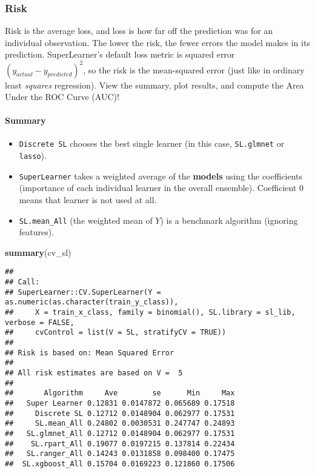 \documentclass[
]{book}
\newenvironment{Shaded}{\begin{snugshade}}{\end{snugshade}}
\newcommand{\KeywordTok}[1]{\textcolor[rgb]{0.13,0.29,0.53}{\textbf{#1}}}
\newcommand{\NormalTok}[1]{#1}
\providecommand{\tightlist}{%
  \setlength{\itemsep}{0pt}\setlength{\parskip}{0pt}}
\begin{document}
\hypertarget{risk}{%
\subsubsection{Risk}\label{risk}}

Risk is the average loss, and loss is how far off the prediction was for an individual observation. The lower the risk, the fewer errors the model makes in its prediction. SuperLearner's default loss metric is squared error \((y_{actual} - y_{predicted})^2\), so the risk is the mean-squared error (just like in ordinary least \emph{squares} regression). View the summary, plot results, and compute the Area Under the ROC Curve (AUC)!

\hypertarget{summary}{%
\paragraph{Summary}\label{summary}}

\begin{itemize}
\tightlist
\item
  \texttt{Discrete\ SL} chooses the best single learner (in this case, \texttt{SL.glmnet} or \texttt{lasso}).
\item
  \texttt{SuperLearner} takes a weighted average of the \textbf{models} using the coefficients (importance of each individual learner in the overall ensemble). Coefficient 0 means that learner is not used at all.
\item
  \texttt{SL.mean\_All} (the weighted mean of \(Y\)) is a benchmark algorithm (ignoring features).
\end{itemize}

\begin{Shaded}
\begin{Highlighting}[]
\KeywordTok{summary}\NormalTok{(cv\_sl)}
\end{Highlighting}
\end{Shaded}

\begin{verbatim}
## 
## Call:  
## SuperLearner::CV.SuperLearner(Y = as.numeric(as.character(train_y_class)),  
##     X = train_x_class, family = binomial(), SL.library = sl_lib, verbose = FALSE,  
##     cvControl = list(V = 5L, stratifyCV = TRUE)) 
## 
## Risk is based on: Mean Squared Error
## 
## All risk estimates are based on V =  5 
## 
##       Algorithm     Ave        se      Min     Max
##   Super Learner 0.12831 0.0147872 0.065689 0.17518
##     Discrete SL 0.12712 0.0148904 0.062977 0.17531
##     SL.mean_All 0.24802 0.0030531 0.247747 0.24893
##   SL.glmnet_All 0.12712 0.0148904 0.062977 0.17531
##    SL.rpart_All 0.19077 0.0197215 0.137814 0.22434
##   SL.ranger_All 0.14243 0.0131858 0.098400 0.17475
##  SL.xgboost_All 0.15704 0.0169223 0.121860 0.17506
\end{verbatim}
\end{document}
